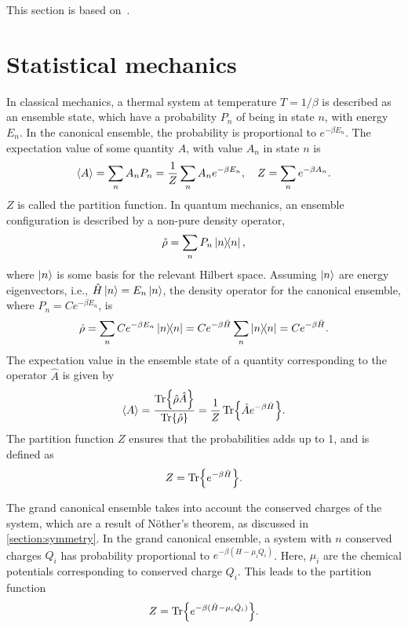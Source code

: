 This section is based on~\cite{Kapusta:finiteTemp,Vuorinen:Thermal_QFT}.

\section{Statistical mechanics}
\label{section:statistical mechanics}

In classical mechanics, a thermal system at temperature $T = 1 / \beta$ is described as an ensemble state, which have a probability $P_n$ of being in state $n$, with energy $E_n$.
In the canonical ensemble, the probability is proportional to $e^{-\beta E_n}$.
The expectation value of some quantity $A$, with value $A_n$ in state $n$ is
\begin{equation*}
    \ex{A} 
    = \sum_n A_n P_n = \frac{1}{Z} \sum_n A_n e^{- \beta E_n}, \quad 
    Z  = \sum_n e^{-\beta A_n}.
\end{equation*}
$Z$ is called the partition function. In quantum mechanics, an ensemble configuration is described by a non-pure density operator,
\begin{equation*}
    \hat \rho = \sum_n P_n \ketbra{n}{n},
\end{equation*}
where $\ket{n}$ is some basis for the relevant Hilbert space. Assuming $\ket{n}$ are energy eigenvectors, i.e., $\hat H \ket{n} = E_n \ket{n}$, the density operator for the canonical ensemble, where $P_n = Ce^{-\beta E_n}$, is
\begin{equation*}
    \hat \rho 
    = \sum_n C e^{-\beta E_n} \ketbra{n}{n} 
    = C e^{-\beta \hat H} \sum_n \ketbra{n}{n} 
    = C e^{-\beta \hat H}.
\end{equation*}
The expectation value in the ensemble state of a quantity corresponding to the operator $\hat A$ is given by
\begin{align}
    \ex{A} = \frac{ \Tr{\hat \rho \hat A} }{\Tr{\hat \rho }}
    = \frac{1}{Z} \Tr{\hat A e^{-\beta \hat H}}.
\end{align}
The partition function $Z$ ensures that the probabilities adds up to 1, and is defined as
\begin{equation}
    Z = \Tr{e^{-\beta \hat H}}.
\end{equation}

The grand canonical ensemble takes into account the conserved charges of the system, which are a result of Nöther's theorem, as discussed in \autoref{section:symmetry}.
In the grand canonical ensemble, a system with $n$ conserved charges $Q_i$ has probability proportional to $e^{-\beta (H - \mu_i Q_i)}$.
Here, $\mu_i$ are the chemical potentials corresponding to conserved charge $Q_i$.
This leads to the partition function
\begin{equation}
    Z = \Tr{e^{-\beta(\hat H - \mu_i \hat Q_i)}}.
\end{equation}

